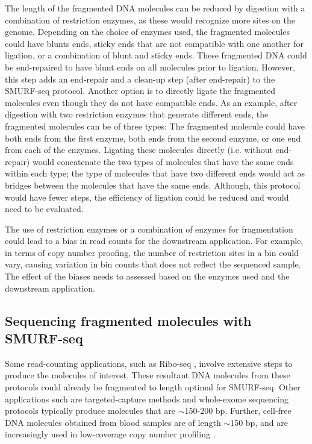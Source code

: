 The length of the fragmented DNA molecules can be reduced by digestion
with a combination of restriction enzymes, as these would recognize more
sites on the genome. Depending on the choice of enzymes used, the
fragmented molecules could have blunts ends, sticky ends that are not
compatible with one another for ligation, or a combination of blunt and
sticky ends.
%
These fragmented DNA could be end-repaired to have blunt ends on all
molecules prior to ligation. However, this step adds an end-repair and a
clean-up step (after end-repair) to the SMURF-seq protocol.
%
Another option is to directly ligate the fragmented molecules even
though they do not have compatible ends. As an example, after digestion
with two restriction enzymes that generate different ends, the
fragmented molecules can be of three types: The fragmented molecule
could have both ends from the first enzyme, both ends from the second
enzyme, or one end from each of the enzymes. Ligating these molecules
directly (i.e. without end-repair) would concatenate the two types of
molecules that have the same ends within each type; the type of
molecules that have two different ends would act as bridges between the
molecules that have the same ends. Although, this protocol would have
fewer steps, the efficiency of ligation could be reduced and would need
to be evaluated.

The use of restriction enzymes or a combination of enzymes for
fragmentation could lead to a bias in read counts for the downstream
application. For example, in terms of copy number proofing, the number
of restriction sites in a bin could vary, causing variation in bin
counts that does not reflect the sequenced sample. The effect of the
biases needs to assessed based on the enzymes used and the downstream
application.


\subsection*{Sequencing fragmented molecules with SMURF-seq}
Some read-counting applications, such as Ribo-seq
\citep{ingolia2009genome}, involve extensive steps to produce the
molecules of interest. These resultant DNA molecules from these
protocols could already be fragmented to length optimal for SMURF-seq.
Other applications such are targeted-capture methods and whole-exome
sequencing protocols typically produce molecules that are $\sim$150-200
bp. Further, cell-free DNA molecules obtained from blood samples are of
length $\sim$150 bp, and are increasingly used in low-coverage copy
number profiling \citep{underhill2016fragment,
adalsteinsson2017scalable}.

